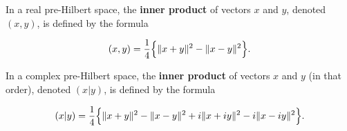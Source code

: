 In a real pre-Hilbert space, the \textbf{inner product} of vectors $x$ and $y$, denoted $(x, y)$, is defined by the formula

\begin{equation}\label{eq:real-inner-product}
(x, y) = \frac{1}{4}\Bigl\{\|x + y\|^2 - \|x - y\|^2\Bigr\}.
\end{equation}

In a complex pre-Hilbert space, the \textbf{inner product} of vectors $x$ and $y$ (in that order), denoted $(x|y)$, is defined by the formula

\begin{equation}\label{eq:complex-inner-product}
(x|y) = \frac{1}{4}\Bigl\{\|x + y\|^2 - \|x - y\|^2 + i\|x + iy\|^2 - i\|x - iy\|^2\Bigr\}.
\end{equation}
